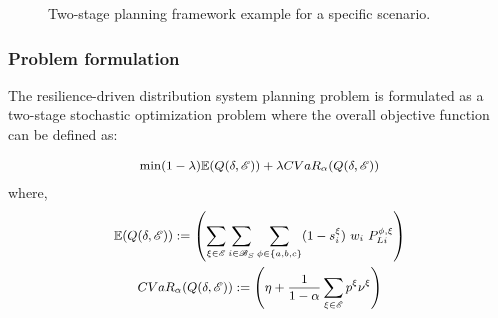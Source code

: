     \begin{figure}[t]
        \centering
        \caption{Two-stage planning framework example for a specific scenario.}
        \label{fig:model_representation}
    \end{figure}

\subsubsection{Problem formulation}
The resilience-driven distribution system planning problem is formulated as a two-stage stochastic optimization problem where the overall objective function can be defined as:

\begin{equation}
\small
    \begin{split}
    \min (1-\lambda)\mathbb{E}(Q(\delta, \mathcal{E})) + \lambda CVaR_\alpha(Q(\delta, \mathcal{E}))
    \end{split}
    \label{eq:main_objective}
\end{equation}
where,
\vspace{-5pt}
\begin{equation*}
\small
    \begin{gathered}
        \mathbb{E}(Q(\delta, \mathcal{E})) := \left(\sum_{\xi \in \mathcal{E}}\sum_{i\in  \mathcal{B}_S}\sum_{\phi\in\{a,b,c\}}(1 - s^\xi_i)\ w_i\ P_{Li}^{\phi,\xi}\right)\\
        CVaR_\alpha(Q(\delta, \mathcal{E})) := \left(\eta + \frac{1}{1-\alpha}\sum_{\xi \in \mathcal{E}}p^\xi\nu^\xi\right)
    \end{gathered}
\end{equation*}

